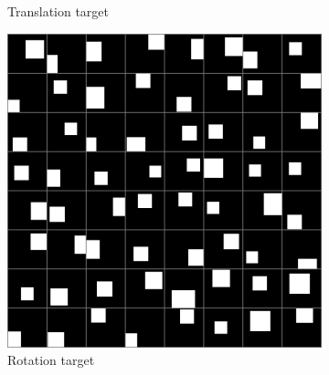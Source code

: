 \documentclass[10pt,a4paper]{article}
\begin{document}
\begin{figure}[!ht]
\begin{subfigure}{0.49\textwidth}
        \caption{Translation target}
        \label{sq_tt}
    \end{subfigure}
    \begin{subfigure}{0.49\textwidth}
        \centering	
        \includegraphics[width=\textwidth]{square_target1.png}
        \caption{Rotation target}
        \label{sq_rt}
    \end{subfigure}
    \caption{} \label{square_images}
\end{figure}
\end{document}

